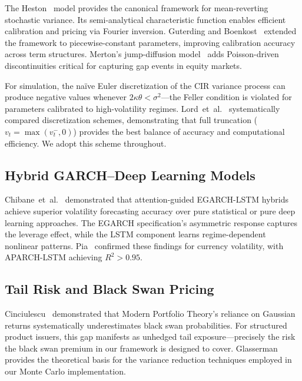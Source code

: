 \documentclass[12pt]{article}
\begin{document}
The Heston~\cite{heston1993closed} model provides the canonical framework for mean-reverting
stochastic variance. Its semi-analytical characteristic function enables efficient calibration
and pricing via Fourier inversion. Guterding and Boenkost~\cite{guterding2024heston} extended
the framework to piecewise-constant parameters, improving calibration accuracy across term
structures. Merton's jump-diffusion model~\cite{merton1976option} adds Poisson-driven
discontinuities critical for capturing gap events in equity markets.

For simulation, the na\"{i}ve Euler discretization of the CIR variance process can produce
negative values whenever $2\kappa\theta < \sigma^2$---the Feller condition is violated for
parameters calibrated to high-volatility regimes. Lord~et~al.~\cite{lord2010comparison}
systematically compared discretization schemes, demonstrating that full truncation
($v_t = \max(v_t^-, 0)$) provides the best balance of accuracy and computational efficiency.
We adopt this scheme throughout.

\subsection{Hybrid GARCH--Deep Learning Models}

Chibane~et~al.~\cite{chibane2025attention} demonstrated that attention-guided EGARCH-LSTM
hybrids achieve superior volatility forecasting accuracy over pure statistical or pure deep
learning approaches. The EGARCH specification's asymmetric response captures the leverage
effect, while the LSTM component learns regime-dependent nonlinear patterns. Pia~\cite{pia2025garch}
confirmed these findings for currency volatility, with APARCH-LSTM achieving $R^2 > 0.95$.

\subsection{Tail Risk and Black Swan Pricing}

Cinciulescu~\cite{cinciulescu2024impact} demonstrated that Modern Portfolio Theory's reliance
on Gaussian returns systematically underestimates black swan probabilities. For structured
product issuers, this gap manifests as unhedged tail exposure---precisely the risk the black
swan premium in our framework is designed to cover. Glasserman~\cite{glasserman2004monte}
provides the theoretical basis for the variance reduction techniques employed in our Monte Carlo
implementation.
\end{document}
